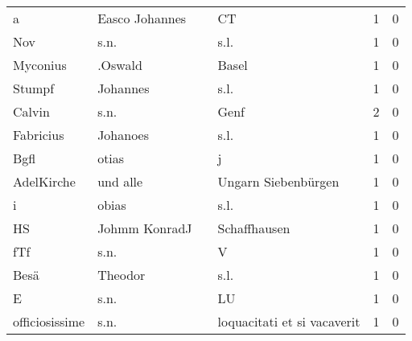 \begin{tabular}{llllrr}
                        a &                     Easco Johannes &             &                                          CT &          1 &         0 \\
                      Nov &                               s.n. &             &                                        s.l. &          1 &         0 \\
                 Myconius &                            .Oswald &             &                                       Basel &          1 &         0 \\
                   Stumpf &                           Johannes &             &                                        s.l. &          1 &         0 \\
                   Calvin &                               s.n. &             &                                        Genf &          2 &         0 \\
                Fabricius &                           Johanoes &             &                                        s.l. &          1 &         0 \\
                     Bgfl &                              otias &             &                                           j &          1 &         0 \\
               AdelKirche &                           und alle &             &                         Ungarn Siebenbürgen &          1 &         0 \\
                        i &                              obias &             &                                        s.l. &          1 &         0 \\
                       HS &                      Johmm KonradJ &             &                                Schaffhausen &          1 &         0 \\
                      fTf &                               s.n. &             &                                           V &          1 &         0 \\
                     Besä &                            Theodor &             &                                        s.l. &          1 &         0 \\
                        E &                               s.n. &             &                                          LU &          1 &         0 \\
           officiosissime &                               s.n. &             &                 loquacitati et si vacaverit &          1 &         0 \\

\end{tabular}
